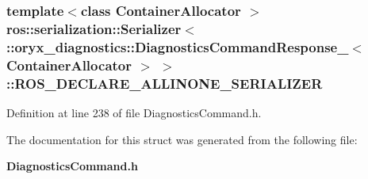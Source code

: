\subsubsection[{\-R\-O\-S\-\_\-\-D\-E\-C\-L\-A\-R\-E\-\_\-\-A\-L\-L\-I\-N\-O\-N\-E\-\_\-\-S\-E\-R\-I\-A\-L\-I\-Z\-E\-R}]{\setlength{\rightskip}{0pt plus 5cm}template$<$class Container\-Allocator $>$ ros\-::serialization\-::\-Serializer$<$ \-::{\bf oryx\-\_\-diagnostics\-::\-Diagnostics\-Command\-Response\-\_\-}$<$ \-Container\-Allocator $>$ $>$\-::{\bf \-R\-O\-S\-\_\-\-D\-E\-C\-L\-A\-R\-E\-\_\-\-A\-L\-L\-I\-N\-O\-N\-E\-\_\-\-S\-E\-R\-I\-A\-L\-I\-Z\-E\-R}}\label{structros_1_1serialization_1_1Serializer_3_01_1_1oryx__diagnostics_1_1DiagnosticsCommandResponse9f8c5441d0c58d15b0b5a048fd53cb94_aec2854f806a5ec52b118f9b48c985271}


\-Definition at line 238 of file \-Diagnostics\-Command.\-h.



\-The documentation for this struct was generated from the following file\-:\begin{DoxyCompactItemize}
\item 
{\bf \-Diagnostics\-Command.\-h}\end{DoxyCompactItemize}
